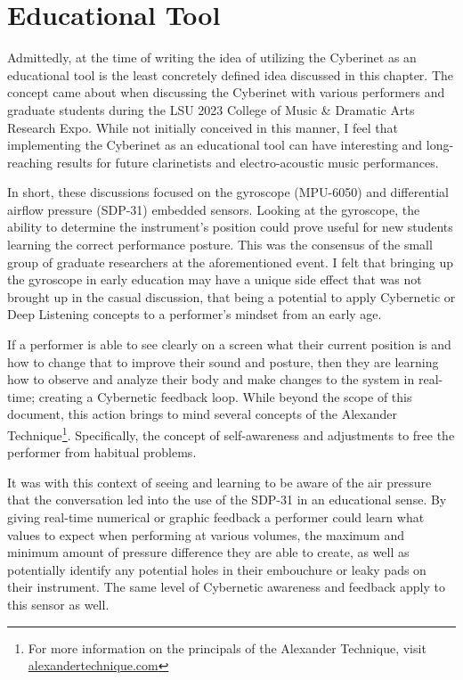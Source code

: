 \section{Educational Tool}
Admittedly, at the time of writing the idea of utilizing the Cyberinet as an educational tool is the least concretely defined idea discussed in this chapter. The concept came about when discussing the Cyberinet with various performers and graduate students during the LSU 2023 College of Music \& Dramatic Arts Research Expo. While not initially conceived in this manner, I feel that implementing the Cyberinet as an educational tool can have interesting and long-reaching results for future clarinetists and electro-acoustic music performances. 

In short, these discussions focused on the gyroscope (MPU-6050) and differential airflow pressure (SDP-31) embedded sensors. Looking at the gyroscope, the ability to determine the instrument's position could prove useful for new students learning the correct performance posture. This was the consensus of the small group of graduate researchers at the aforementioned event. I felt that bringing up the gyroscope in early education may have a unique side effect that was not brought up in the casual discussion, that being a potential to apply Cybernetic or Deep Listening concepts to a performer's mindset from an early age.

If a performer is able to see clearly on a screen what their current position is and how to change that to improve their sound and posture, then they are learning how to observe and analyze their body and make changes to the system in real-time; creating a Cybernetic feedback loop\cite{WeinerCybernetics2019}. While beyond the scope of this document, this action brings to mind several concepts of the Alexander Technique\footnote{For more information on the principals of the Alexander Technique, visit \url{alexandertechnique.com}}. Specifically, the concept of self-awareness and adjustments to free the performer from habitual problems\cite{gelbBodyLearning2013}.

It was with this context of seeing and learning to be aware of the air pressure that the conversation led into the use of the SDP-31 in an educational sense. By giving real-time numerical or graphic feedback a performer could learn what values to expect when performing at various volumes, the maximum and minimum amount of pressure difference they are able to create, as well as potentially identify any potential holes in their embouchure or leaky pads on their instrument. The same level of Cybernetic awareness and feedback apply to this sensor as well.

